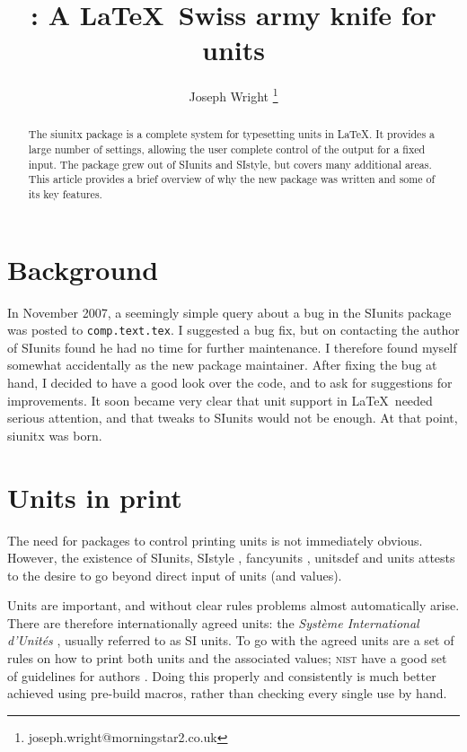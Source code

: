 \documentclass{article}
\title{\pkg{siunitx}: A \LaTeX\ Swiss army knife for units}
\author{%
  Joseph Wright%
  \thanks{{joseph.wright@morningstar2.co.uk}}%
}
\providecommand*\pkg[1]{\textsf{#1}}
\begin{document}
\maketitle

\begin{abstract}
The \pkg{siunitx} package is a complete system for typesetting
units in \LaTeX.  It provides a large number of settings,
allowing the user complete control of the output for a fixed
input.  The package grew out of \pkg{SIunits} and
\pkg{SIstyle}, but covers many additional areas.  This article
provides a brief overview of why the new package was written
and some of its key features.
\end{abstract}

\section{Background}

In November 2007, a seemingly simple query about a bug in the
\pkg{SIunits} package \cite{Heldorn2007} was posted to
\texttt{comp.text.tex}. I suggested a bug fix, but on
contacting the author of \pkg{SIunits} found he had no time for
further maintenance.  I therefore found myself somewhat
accidentally as the new package maintainer.  After fixing the
bug at hand, I decided to have a good look over the code, and
to ask for suggestions for improvements.  It soon became very
clear that unit support in \LaTeX\ needed serious attention,
and that tweaks to \pkg{SIunits} would not be enough.  At that
point, \pkg{siunitx} was born.

\section{Units in print}

The need for packages to control printing units is not
immediately obvious.  However, the existence of \pkg{SIunits},
\pkg{SIstyle} \cite{Els2006}, \pkg{fancyunits}
\cite{Bauke2007}, \pkg{unitsdef} \cite{Happel2005} and
\pkg{units} \cite{Reichert1998} attests to the desire to go
beyond direct input of units (and values).

Units are important, and without clear rules problems almost
automatically arise.  There are therefore internationally
agreed units: the \emph{Syst\`eme International d'Unit\'es}
\cite{BIPM2008}, usually referred to as SI units.  To go with
the agreed units are a set of rules on how to print both units
and the associated values; \textsc{nist} have a good set of
guidelines for authors \cite{NIST2008}.  Doing this properly
and consistently is much better achieved using pre-build
macros, rather than checking every single use by hand.
\end{document}
